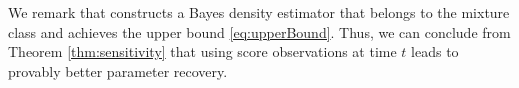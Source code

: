 \documentclass[11pt]{article}
\theoremstyle{plain}
\newcommand{\1}{\mathbbm{1}}
\begin{document}



We remark that \citet{yangBarron} constructs a Bayes density estimator that belongs to the mixture class and achieves the upper bound \eqref{eq:upperBound}. Thus, we can conclude from Theorem \ref{thm:sensitivity} that using score observations at time $t$ leads to provably better parameter recovery.
 

\end{document}
